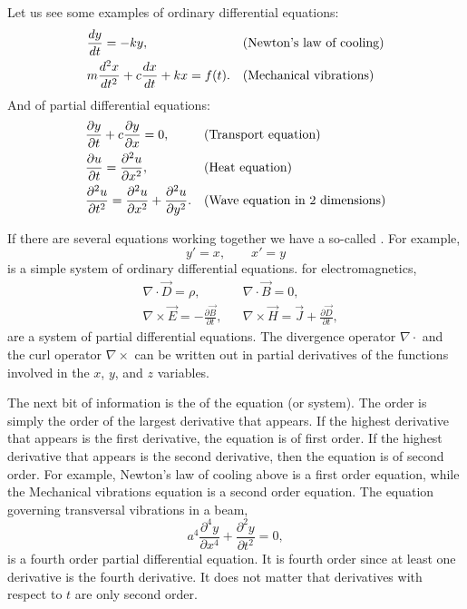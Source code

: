 Let us see some examples of ordinary differential equations:
\begin{align*}
& \frac{d y}{dt} = -ky , & & \text{(\myindex{Newton's law of cooling})} \\
& m \frac{d^2 x}{dt^2} + c \frac{dx}{dt} + kx = f(t) . & &
\text{(Mechanical vibrations\index{mechanical vibrations})}
\end{align*}
And of partial differential equations:
\begin{align*}
& \frac{\partial y}{\partial t} + c \frac{\partial y}{\partial x} = 0 , & & 
\text{(Transport equation\index{transport equation})} \\
& \frac{\partial u}{\partial t} = \frac{\partial^2 u}{\partial x^2} , & & 
\text{(Heat equation\index{heat equation})} \\
& \frac{\partial^2 u}{\partial t^2} = \frac{\partial^2 u}{\partial x^2} +
\frac{\partial^2 u}{\partial y^2} . & & 
\text{(Wave equation in 2 dimensions\index{wave equation in 2 dimensions})}
\end{align*}

If there are several equations working together we have a so-called
\emph{}.  For example,
\begin{equation*}
y' = x , \qquad x' = y
\end{equation*}
is a simple system of ordinary differential equations.
 for electromagnetics,
\begin{align*}
& \nabla \cdot \vec{D} = \rho, & & \nabla \cdot \vec{B} = 0 , \\
& \nabla \times \vec{E} = - \frac{\partial \vec{B}}{\partial t}, &
& \nabla \times \vec{H} = \vec{J} + \frac{\partial \vec{D}}{\partial t} ,
\end{align*}
are a system of partial differential equations. 
The divergence operator $\nabla \cdot$ and the
curl operator $\nabla \times$ can be written out in partial derivatives of
the functions involved in the $x$, $y$, and $z$ variables.

\medskip

The next bit of information is the \emph{} of the
equation (or system).  The order is simply the order of the largest
derivative that appears.  If the highest derivative that appears is
the first derivative, the equation is of first order.  If the highest
derivative that appears is the second derivative, then the equation is of second
order.  For example, Newton's law of cooling above is a first order
equation, while the Mechanical vibrations equation is a second order equation.
The equation governing transversal vibrations in a beam,
\begin{equation*}
a^4 \frac{\partial^4 y}{\partial x^4} + \frac{\partial^2 y}{\partial t^2} = 0,
\end{equation*}
is a fourth order partial differential equation.  It is
fourth order since at least one derivative is the fourth derivative.  It
does not matter that derivatives with respect to $t$ are only second order.


